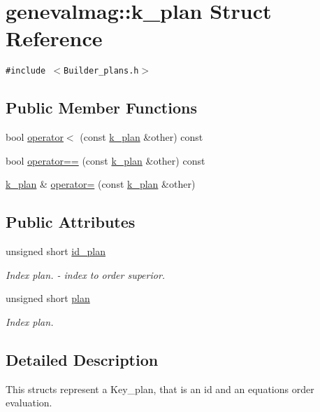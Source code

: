 \hypertarget{structgenevalmag_1_1k__plan}{
\section{genevalmag::k\_\-plan Struct Reference}
\label{structgenevalmag_1_1k__plan}
}
{\tt \#include $<$Builder\_\-plans.h$>$}

\subsection*{Public Member Functions}
\begin{CompactItemize}
\item 
bool \hyperlink{structgenevalmag_1_1k__plan_86eb6ce02cbf73824a1f34603cfc6b9f}{operator$<$} (const \hyperlink{structgenevalmag_1_1k__plan}{k\_\-plan} \&other) const 
\item 
bool \hyperlink{structgenevalmag_1_1k__plan_1ebe5a12c410624fec9631ff2e522767}{operator==} (const \hyperlink{structgenevalmag_1_1k__plan}{k\_\-plan} \&other) const 
\item 
\hyperlink{structgenevalmag_1_1k__plan}{k\_\-plan} \& \hyperlink{structgenevalmag_1_1k__plan_1e209c36e06a2f83d17287e7e31f5ba8}{operator=} (const \hyperlink{structgenevalmag_1_1k__plan}{k\_\-plan} \&other)
\end{CompactItemize}
\subsection*{Public Attributes}
\begin{CompactItemize}
\item 
unsigned short \hyperlink{structgenevalmag_1_1k__plan_477573001560bced8ad15aa7a5013ac0}{id\_\-plan}
\begin{CompactList}\small\item\em Index plan. - index to order superior. \item\end{CompactList}\item 
unsigned short \hyperlink{structgenevalmag_1_1k__plan_c948a26cdaa4b9ea54cc04ac27c99e3c}{plan}
\begin{CompactList}\small\item\em Index plan. \item\end{CompactList}\end{CompactItemize}


\subsection{Detailed Description}
This structs represent a Key\_\-plan, that is an id and an equations order evaluation. 

